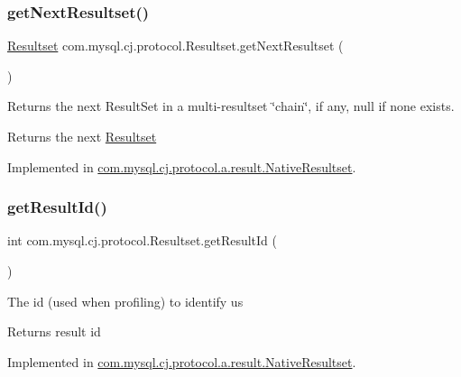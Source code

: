 \subsubsection{\texorpdfstring{get\+Next\+Resultset()}{getNextResultset()}}
{\footnotesize\ttfamily \mbox{\hyperlink{interfacecom_1_1mysql_1_1cj_1_1protocol_1_1_resultset}{Resultset}} com.\+mysql.\+cj.\+protocol.\+Resultset.\+get\+Next\+Resultset (\begin{DoxyParamCaption}{ }\end{DoxyParamCaption})}

Returns the next Result\+Set in a multi-\/resultset \char`\"{}chain\char`\"{}, if any, null if none exists.

\begin{DoxyReturn}{Returns}
the next \mbox{\hyperlink{interfacecom_1_1mysql_1_1cj_1_1protocol_1_1_resultset}{Resultset}} 
\end{DoxyReturn}


Implemented in \mbox{\hyperlink{classcom_1_1mysql_1_1cj_1_1protocol_1_1a_1_1result_1_1_native_resultset_a62322ab9154b99ce2ee8c0aca9b90faa}{com.\+mysql.\+cj.\+protocol.\+a.\+result.\+Native\+Resultset}}.

\mbox{\label{interfacecom_1_1mysql_1_1cj_1_1protocol_1_1_resultset_a77886132904378ea915db2b4803e588c}} 
\subsubsection{\texorpdfstring{get\+Result\+Id()}{getResultId()}}
{\footnotesize\ttfamily int com.\+mysql.\+cj.\+protocol.\+Resultset.\+get\+Result\+Id (\begin{DoxyParamCaption}{ }\end{DoxyParamCaption})}

The id (used when profiling) to identify us

\begin{DoxyReturn}{Returns}
result id 
\end{DoxyReturn}


Implemented in \mbox{\hyperlink{classcom_1_1mysql_1_1cj_1_1protocol_1_1a_1_1result_1_1_native_resultset_ad10ec652380313c1eb2cb1dd67c4ea7e}{com.\+mysql.\+cj.\+protocol.\+a.\+result.\+Native\+Resultset}}.

